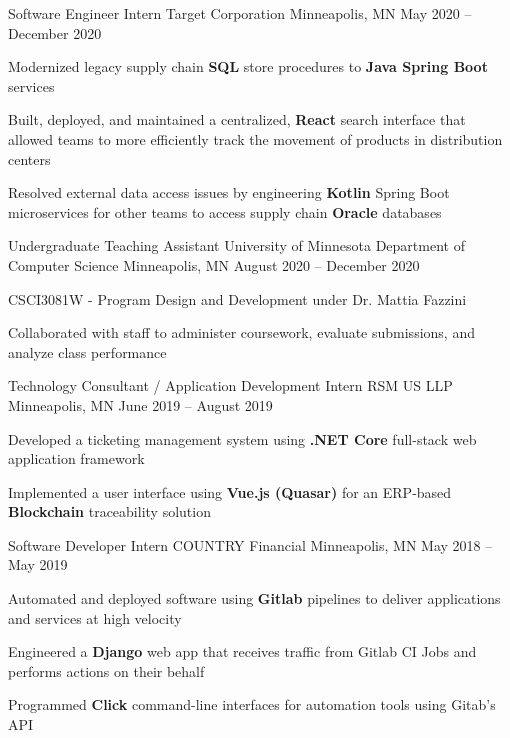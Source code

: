 \documentclass[]{awesome-cv}
\begin{document}
\vspace{-9mm}
\begin{cventries}
	\cventry
	{Software Engineer Intern}
	{Target Corporation}
	{Minneapolis, MN}
	{May 2020 – December 2020}
	{\begin{cvitems}
		\item {Modernized legacy supply chain \textbf{SQL} store procedures to \textbf{Java Spring Boot} services}
		\item {Built, deployed, and maintained a centralized, \textbf{React} search interface that allowed teams to more efficiently track the movement of products in distribution centers}
		\item {Resolved external data access issues by engineering \textbf{Kotlin} Spring Boot microservices for other teams to access supply chain \textbf{Oracle} databases}
		\end{cvitems}}
	\cventry
	{Undergraduate Teaching Assistant}
	{University of Minnesota Department of Computer Science}
	{Minneapolis, MN}
	{August 2020 – December 2020}
	{\begin{cvitems}
    	\item {CSCI3081W - Program Design and Development under Dr. Mattia Fazzini}
		\item {Collaborated with staff to administer coursework, evaluate submissions, and analyze class performance}
		\end{cvitems}}
	\cventry
	{Technology Consultant / Application Development Intern}
	{RSM US LLP}
	{Minneapolis, MN}
	{June 2019 – August 2019}
	{\begin{cvitems}
		\item {Developed a ticketing management system using  \textbf{.NET Core} full-stack web application framework}
		\item {Implemented a user interface using \textbf{Vue.js (Quasar)} for an ERP-based \textbf{Blockchain} traceability solution}
		\end{cvitems}}
	\cventry
	{Software Developer Intern}
	{COUNTRY Financial}
	{Minneapolis, MN}
	{May 2018 – May 2019}
	{\begin{cvitems}
		\item {Automated and deployed software using \textbf{Gitlab} pipelines to deliver applications and services at high velocity}
		\item {Engineered a \textbf{Django} web app that receives traffic from Gitlab CI Jobs and performs actions on their behalf}
		\item{Programmed \textbf{Click} command-line interfaces for automation tools using Gitab’s API}
		\end{cvitems}}
\end{cventries}
\end{document}

